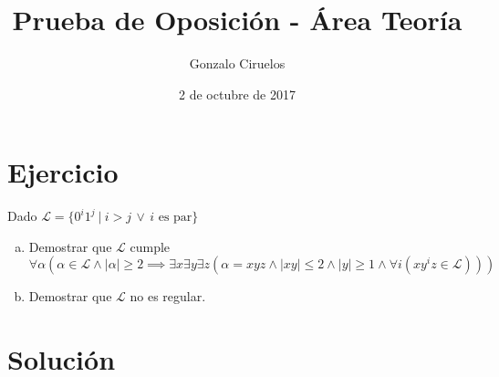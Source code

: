 \documentclass[hidelinks,a4paper,10pt, nofootinbib]{article}
\title{Prueba de Oposición - Área Teoría}
\author{Gonzalo Ciruelos}
\date{2 de octubre de 2017}
\newcommand{\ele}{\mathcal{L}}
\begin{document}
\maketitle

\section*{Ejercicio}

Dado $\ele = \{0^i 1^j\ |\ i > j \, \lor \, i \text{ es par}\}$

\begin{enumerate}[a.]
\item Demostrar que $\ele$ cumple
  \[\forall \alpha( \alpha \in \ele \land |\alpha| \geq 2 \implies 
            \exists x \exists y  \exists z (
                        \alpha = x y z \land
                        |x y| \leq 2 \land
                        |y| \geq 1 \land
                        \forall i (x y^i z \in \ele))) \]
\item Demostrar que $\ele$ no es regular.
\end{enumerate}
                         
\section*{Solución}
\end{document}
